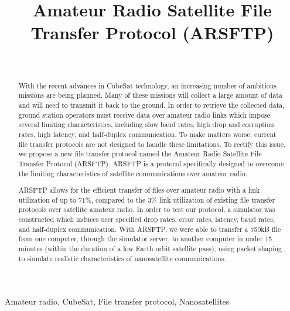 \documentclass[journal]{./IEEEtran}
\begin{document}
\title{Amateur Radio Satellite File Transfer Protocol (ARSFTP)}

\author{\\
}

\maketitle

\begin{abstract}

With the recent advances in CubeSat technology, an increasing number of ambitious missions are being planned. Many of these missions will collect a large amount of data and will need to transmit it back to the ground. In order to retrieve the collected data, ground station operators must receive data over amateur radio links which impose several limiting characteristics, including slow baud rates, high drop and corruption rates, high latency, and half-duplex communication. To make matters worse, current file transfer protocols are not designed to handle these limitations. To rectify this issue, we propose a new file transfer protocol named the Amateur Radio Satellite File Transfer Protocol (ARSFTP).  ARSFTP is a protocol specifically designed to overcome the limiting characteristics of satellite communications over amateur radio.

ARSFTP allows for the efficient transfer of files over amateur radio with a link utilization of up to 71\%, compared to the 3\% link utilization of existing file transfer protocols over satellite amateur radio.  In order to test our protocol, a simulator was constructed which induces user specified drop rates, error rates, latency, baud rates, and half-duplex communication. With ARSFTP, we were able to transfer a 750kB file from one computer, through the simulator server, to another computer in under 15 minutes (within the duration of a low Earth orbit satellite pass), using packet shaping to simulate realistic characteristics of nanosatellite communications.

\end{abstract}

\begin{IEEEkeywords}
Amateur radio, CubeSat, File transfer protocol, Nanosatellites
\end{IEEEkeywords}
\end{document}
